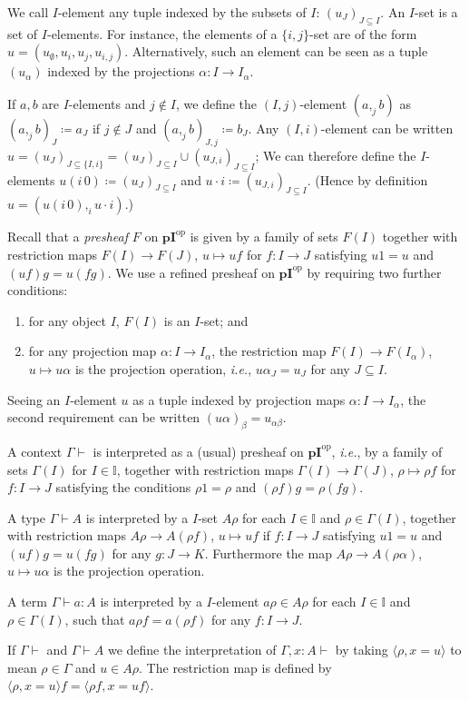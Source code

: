 \documentclass[english]{PaperTools/latex/lipics}
\def\pI{\ensuremath{\mathbf{pI}}}
\def\ie{\textit{i.e.}}
\def\opp{\mathrm{op}}
\begin{document}
\begin{definition}[$I$-set]
  We call $I$-element any tuple indexed by the subsets of $I$: $(u_J)_{J ⊆ I}$.
  An $I$-set is a set of $I$-elements.  For instance, the elements of a
  $\{i,j\}$-set are of the form $u = (u_∅,u_i,u_j,u_{i,j})$.
  Alternatively, such an element can be seen as a tuple $(u_α)$ indexed
  by the projections $α : I → I_α$.
\end{definition}
  If $a,b$ are $I$-elements and $j ∉ I$, we define the $(I,j)$-element
  $(a ,_j b)$ as $(a ,_j b)_J ≔ a_J$ if $j ∉ J$ and $(a ,_j b)_{J,j} ≔ b_J$.
  Any $(I,i)$-element can be written $u = (u_J)_{J ⊆ \{I,i\}} = (u_J)_{J ⊆ I} ∪ (u_{J,i})_{J ⊆ I}$;
  We can therefore define the $I$-elements $u (i\,0) ≔ (u_J)_{J ⊆ I}$ and $u · i ≔ (u_{J,i})_{J ⊆ I}$.
  (Hence by definition $u = (u (i\,0) ,_i u · i)$.)

\bigskip
Recall that a \emph{presheaf} $F$ on $\pI^\opp$ is given by a family of
sets $F(I)$ together with restriction maps $F(I) → F(J)$, $u ↦ uf$ for
$f : I → J$ satisfying $u1 = u$ and $(uf)g = u(fg)$. We use a refined
presheaf on $\pI^\opp$ by requiring two further conditions:
%
\begin{enumerate}
  \item for any object $I$, $F(I)$ is an $I$-set; and
  \item for any projection map $α : I → I_α$, the restriction
    map $F(I) → F(I_α)$, $u ↦ uα$ is the projection operation, \ie,
    $uα_J = u_J$ for any $J ⊆ I$.
\end{enumerate}
%
Seeing an $I$-element $u$ as a tuple indexed by projection maps
$α : I → I_α$, the second requirement can be written $(uα)_β = u_{αβ}$.

\bigskip
A context $Γ ⊢$ is interpreted as a (usual) presheaf on $\pI^\opp$, \ie,
by a family of sets $Γ(I)$ for $I ∈ 𝕀$, together with restriction maps
$Γ(I) → Γ(J)$, $ρ ↦ ρf$ for $f : I → J$ satisfying the conditions
$ρ1 = ρ$ and $(ρf)g = ρ(fg)$.

\medskip
A type $Γ ⊢ A$ is interpreted by a $I$-set $Aρ$ for each $I ∈ 𝕀$ and
$ρ ∈ Γ(I)$,
together with restriction maps $Aρ → A(ρf)$, $u ↦ uf$ if $f : I → J$
satisfying $u1 = u$ and $(uf)g = u(fg)$ for any $g : J → K$.
Furthermore the map $Aρ → A(ρα)$, $u ↦ uα$ is the projection operation.

\medskip
A term $Γ ⊢ a : A$ is interpreted by a $I$-element $aρ ∈ Aρ$ for each
$I ∈ 𝕀$ and $ρ ∈ Γ(I)$, such that $aρf = a(ρf)$ for any $f : I → J$.

\medskip
If $Γ⊢$ and $Γ ⊢ A$ we define the interpretation of $Γ,x:A ⊢$
by taking $⟨ρ,x=u⟩$ to mean $ρ ∈ Γ$ and $u ∈ Aρ$.
The restriction map is defined by $⟨ρ,x=u⟩f = ⟨ρf, x=uf⟩$.
\end{document}
